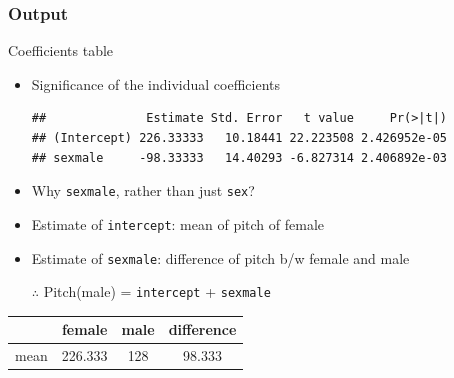 \documentclass[10p]{beamer}\usepackage[]{graphicx}\usepackage[]{color}
\makeatletter
\newenvironment{kframe}{%
 \def\at@end@of@kframe{}%
 \ifinner\ifhmode%
  \def\at@end@of@kframe{\end{minipage}}%
  \begin{minipage}{\columnwidth}%
 \fi\fi%
 \def\FrameCommand##1{\hskip\@totalleftmargin \hskip-\fboxsep
 \colorbox{shadecolor}{##1}\hskip-\fboxsep
     \hskip-\linewidth \hskip-\@totalleftmargin \hskip\columnwidth}%
 \MakeFramed {\advance\hsize-\width
   \@totalleftmargin\z@ \linewidth\hsize
   \@setminipage}}%
 {\par\unskip\endMakeFramed%
 \at@end@of@kframe}
\newenvironment{knitrout}{}{} %
\makeatother
\begin{document}
\begin{frame}[fragile]
\frametitle{Output}
Coefficients table
\begin{itemize}
\item Significance of the individual coefficients
\begin{knitrout}\scriptsize
{}\color{fgcolor}\begin{kframe}
\begin{verbatim}
##              Estimate Std. Error   t value     Pr(>|t|)
## (Intercept) 226.33333   10.18441 22.223508 2.426952e-05
## sexmale     -98.33333   14.40293 -6.827314 2.406892e-03
\end{verbatim}
\end{kframe}
\end{knitrout}
\item Why \texttt{sexmale}, rather than just \texttt{sex}?
	\item Estimate of \texttt{intercept}: mean of pitch of female 
	\item Estimate of \texttt{sexmale}: difference of pitch b/w female and male
	
$\therefore$ Pitch(male) = \texttt{intercept} + \texttt{sexmale}
\end{itemize}

\vspace{9pt}
\begin{center}
\begin{tabular}{cccc}

\toprule
& female & male & difference \\
\midrule
mean & 226.333 & 128 & 98.333 \\
\bottomrule
\end{tabular}
\end{center}
\end{frame}
\end{document}
